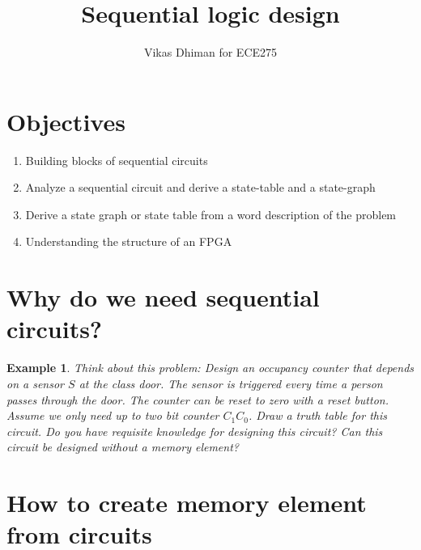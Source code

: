 \documentclass{article}
\author{Vikas Dhiman for ECE275}
\title{Sequential logic design}
\newtheorem{example}{Example}
\begin{document}
\maketitle


\section{Objectives}
\begin{enumerate}
  \item Building blocks of sequential circuits
  \item Analyze a sequential circuit and derive a state-table and a state-graph
  \item Derive a state graph or state table from a word description of the problem
  \item Understanding the structure of an FPGA
\end{enumerate}

\section{Why do we need sequential circuits?}

\begin{example}
  Think about this problem: Design an occupancy counter that depends on a
  sensor $S$ at the class door. The sensor is triggered every time a person passes
  through the door. The counter can be reset to zero with a reset button. Assume
  we only need up to two bit counter $C_1C_0$. Draw a truth table for this
  circuit. Do you have requisite knowledge for designing this circuit? Can this
  circuit be designed without a memory element?
\end{example}
\vspace{10em}


\section{How to create memory element from circuits}
\end{document}
